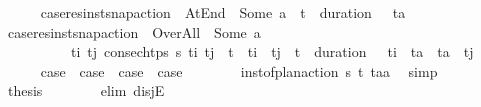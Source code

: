 \begin{isabellebody}
\ \ \ \ \isamarkupfalse%
\ {\isacharquery}{\kern0pt}case{}{\isacharequal}{\kern0pt}{\isachardoublequoteopen}res{\isacharunderscore}{\kern0pt}inst{\isacharunderscore}{\kern0pt}snap{\isacharunderscore}{\kern0pt}action\ {\isasympi}\ At{\isacharunderscore}{\kern0pt}End\ {\isacharequal}{\kern0pt}\ Some\ a\ {\isasymand}\ t\isactrlsub {\isasympi}\ {\isacharplus}{\kern0pt}\ {\isacharparenleft}{\kern0pt}duration\ {\isasympi}{\isacharparenright}{\kern0pt}\ {\isacharequal}{\kern0pt}\ t\isactrlsub a{\isachardoublequoteclose}\isanewline
\ \ \ \ \isamarkupfalse%
\ {\isacharquery}{\kern0pt}case{}{\isacharequal}{\kern0pt}{\isachardoublequoteopen}res{\isacharunderscore}{\kern0pt}inst{\isacharunderscore}{\kern0pt}snap{\isacharunderscore}{\kern0pt}action\ {\isasympi}\ Over{\isacharunderscore}{\kern0pt}All\ {\isacharequal}{\kern0pt}\ Some\ a\ {\isasymand}\ \isanewline
\ \ \ \ \ \ \ \ \ \ {\isacharparenleft}{\kern0pt}{\isasymexists}t\isactrlsub i\ t\isactrlsub j{\isachardot}{\kern0pt}\ consec{\isacharunderscore}{\kern0pt}htps\ {\isasympi}s\ t\isactrlsub i\ t\isactrlsub j\ {\isasymand}\ t\isactrlsub {\isasympi}\ {\isasymle}\ t\isactrlsub i\ {\isasymand}\ t\isactrlsub j\ {\isasymle}\ t\isactrlsub {\isasympi}\ {\isacharplus}{\kern0pt}\ {\isacharparenleft}{\kern0pt}duration\ {\isasympi}{\isacharparenright}{\kern0pt}\ {\isasymand}\ t\isactrlsub i\ {\isacharless}{\kern0pt}\ t\isactrlsub a\ {\isasymand}\ t\isactrlsub a\ {\isacharless}{\kern0pt}\ t\isactrlsub j{\isacharparenright}{\kern0pt}{\isachardoublequoteclose}\isanewline
\ \ \ \ \isamarkupfalse%
\ {\isachardoublequoteopen}{\isacharquery}{\kern0pt}case{}\ {\isasymor}\ {\isacharquery}{\kern0pt}case{}\ {\isasymor}\ {\isacharquery}{\kern0pt}case{}\ {\isasymor}\ {\isacharquery}{\kern0pt}case{}{\isachardoublequoteclose}\isanewline
\ \ \ \ \ \ \isamarkupfalse%
\ {\isacartoucheopen}inst{\isacharunderscore}{\kern0pt}of{\isacharunderscore}{\kern0pt}plan{\isacharunderscore}{\kern0pt}action\ {\isasympi}s\ {\isacharparenleft}{\kern0pt}t\isactrlsub {\isasympi}{\isacharcomma}{\kern0pt}{\isasympi}{\isacharparenright}{\kern0pt}\ {\isacharparenleft}{\kern0pt}t\isactrlsub a{\isacharcomma}{\kern0pt}a{\isacharparenright}{\kern0pt}{\isacartoucheclose}\ \isamarkupfalse%
\ simp\isanewline
\ \ \ \ \isamarkupfalse%
\ \isamarkupfalse%
\ {\isacharquery}{\kern0pt}thesis\isanewline
\ \ \ \ \ \ \isamarkupfalse%
\ {\isacharparenleft}{\kern0pt}elim\ disjE{\isacharparenright}{\kern0pt}\isanewline

\end{isabellebody}

